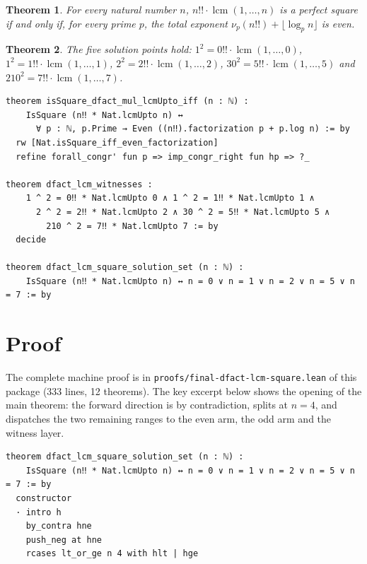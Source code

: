 \documentclass[11pt]{article}
\newtheorem{theorem}{Theorem}
\begin{document}
\begin{theorem}\label{thm:parity}
For every natural number $n$, $n!! \cdot \operatorname{lcm}(1,\dots,n)$ is a perfect square
if and only if, for every prime $p$, the total exponent
$\nu_p(n!!) + \lfloor \log_p n \rfloor$ is even.
\end{theorem}

\begin{theorem}\label{thm:witnesses}
The five solution points hold:
$1^2 = 0!! \cdot \operatorname{lcm}(1,\dots,0)$, $1^2 = 1!! \cdot \operatorname{lcm}(1,\dots,1)$,
$2^2 = 2!! \cdot \operatorname{lcm}(1,\dots,2)$, $30^2 = 5!! \cdot \operatorname{lcm}(1,\dots,5)$
and $210^2 = 7!! \cdot \operatorname{lcm}(1,\dots,7)$.
\end{theorem}

\begin{lstlisting}[caption={Formal statements (Lean 4, frozen snapshot \texttt{9baa672f}).},label={lst:stmt}]
theorem isSquare_dfact_mul_lcmUpto_iff (n : ℕ) :
    IsSquare (n‼ * Nat.lcmUpto n) ↔
      ∀ p : ℕ, p.Prime → Even ((n‼).factorization p + p.log n) := by
  rw [Nat.isSquare_iff_even_factorization]
  refine forall_congr' fun p => imp_congr_right fun hp => ?_

theorem dfact_lcm_witnesses :
    1 ^ 2 = 0‼ * Nat.lcmUpto 0 ∧ 1 ^ 2 = 1‼ * Nat.lcmUpto 1 ∧
      2 ^ 2 = 2‼ * Nat.lcmUpto 2 ∧ 30 ^ 2 = 5‼ * Nat.lcmUpto 5 ∧
        210 ^ 2 = 7‼ * Nat.lcmUpto 7 := by
  decide

theorem dfact_lcm_square_solution_set (n : ℕ) :
    IsSquare (n‼ * Nat.lcmUpto n) ↔ n = 0 ∨ n = 1 ∨ n = 2 ∨ n = 5 ∨ n = 7 := by
\end{lstlisting}

\section{Proof}
The complete machine proof is in \texttt{proofs/final-dfact-lcm-square.lean} of this
package (333 lines, 12 theorems). The key excerpt below shows the opening of the main
theorem: the forward direction is by contradiction, splits at $n = 4$, and dispatches the
two remaining ranges to the even arm, the odd arm and the witness layer.

\begin{lstlisting}[caption={Excerpt: the main theorem, forward direction (frozen artifact, sha256 \texttt{1107cad4}).},label={lst:proof}]
theorem dfact_lcm_square_solution_set (n : ℕ) :
    IsSquare (n‼ * Nat.lcmUpto n) ↔ n = 0 ∨ n = 1 ∨ n = 2 ∨ n = 5 ∨ n = 7 := by
  constructor
  · intro h
    by_contra hne
    push_neg at hne
    rcases lt_or_ge n 4 with hlt | hge
\end{lstlisting}
\end{document}
